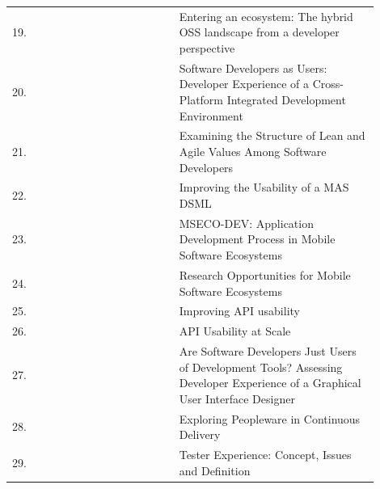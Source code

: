 \documentclass[english, 12pt, a4paper, sci, utf8, a-1b, online]{aaltothesis}
\begin{document}
\begin{center}
\begin{longtable}{p{0.05\linewidth}p{0.35\linewidth}p{0.5\linewidth}}
    19. & \textcite{entering-an-ecosystem}                      & Entering an ecosystem: The hybrid OSS landscape from a developer perspective                                                                \\
    20. & \textcite{software-developers-as-users}               & Software Developers as Users: Developer Experience of a Cross-Platform Integrated Development Environment                                   \\
    21. & \textcite{fagerholm2014examining}                     & Examining the Structure of Lean and Agile Values Among Software Developers                                                                  \\
    22. & \textcite{miranda2018improving}                       & Improving the Usability of a MAS DSML                                                                                                       \\
    23. & \textcite{fontao2016mseco}                            & MSECO-DEV: Application Development Process in Mobile Software Ecosystems                                                                    \\
    24. & \textcite{fontao2015research}                         & Research Opportunities for Mobile Software Ecosystems                                                                                       \\
    25. & \textcite{myers2016improving}                         & Improving API usability                                                                                                                     \\
    26. & \textcite{macvean2016api}                             & API Usability at Scale                                                                                                                      \\
    27. & \textcite{kuusinen2016software}                       & Are Software Developers Just Users of Development Tools? Assessing Developer Experience of a Graphical User Interface Designer              \\
    28. & \textcite{karpanoja2016exploring}                     & Exploring Peopleware in Continuous Delivery                                                                                                 \\
    29. & \textcite{ekwoge2017tester}                           & Tester Experience: Concept, Issues and Definition                                                                                           \\

\end{longtable}
\end{center}
\end{document}
